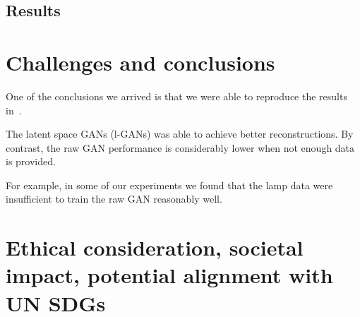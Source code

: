 \documentclass[12pt]{article}
\newcommand{\contentdescription}[1]{}
\begin{document}
    \subsection{Results}


    \section{Challenges and conclusions}
    \label{sec:conclusions}
    \contentdescription{
        Challenges and Conclusions (5-15\%):
        Challenges you faced when reimplementing the paper and conducting the experiments.
        Were all details in the paper?
        Or did you have to look in the authors code or even contact them to find about some details?
        Was parts of the code quite hard to get them to work as intended?
        Did you have optimize and tune several hyperparameters?
        Which ones?
        Did the framework you used make the implementation difficult in some ways?

        Summarize your key results - what have you learned?
        What points do you think one should consider when using the approach of the paper you chose for your project?
        Suggest ideas for future extensions or new applications of your ideas.
    }

    One of the conclusions we arrived is that we were able to reproduce the results in~\cite{pmlr-v80-achlioptas18a}.

    The latent space GANs (l-GANs) was able to achieve better reconstructions.
    By contrast, the raw GAN performance is considerably lower when not enough data is provided.

    For example, in some of our experiments we found that the lamp data were insufficient to train the raw GAN reasonably well.


    \section{Ethical consideration, societal impact, potential alignment with UN SDGs}
    \contentdescription{
        Ethical consideration, societal impact, potential alignment with UN SDGs (5-10\%):
        Think and research!
        Are there any ethical considerations for the original paper, its problem or method, its way of conducting experiments?
        How about your task, your datasets, and the experiments you did?
        What societal impact can you imagine about the original paper and its contributions and results?
        How about your project report?
        How do you think this paper can push the UN SDG targets?
    }
\end{document}
